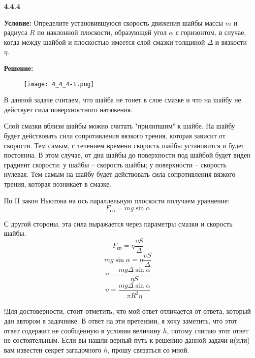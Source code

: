 \documentclass[a4paper,12pt]{article}	%
\begin{document}
 
\textbf{4.4.4}

\textbf{Условие:}
Определите установившуюся скорость движения шайбы массы $m$ и радиуса $R$ по наклонной плоскости, образующей угол $\alpha$ с горизонтом, в случае, когда между шайбой и плоскостью имеется слой смазки толщиной $\Delta$ и вязкости $\eta$.

\textbf{Решение:}
\begin{figure}[htp]
	\centering
	\texttt{[image: 4\_4\_4-1.png]}
\end{figure}

В данной задаче считаем, что шайба не тонет в слое смазке и что на шайбу не дей\-ству\-ет сила поверхностного натяжения.

Слой смазки вблизи шайбы можно считать "прилипшим" к шайбе. На шайбу бу\-дет действовать сила сопротивления вязкого трения, которая зависит от скорости. Тем са\-мым, с течением времени скорость шайбы установится и будет постоянна. В этом случае, от дна шайбы до поверхности под шайбой будет виден градиент скорости: у шайбы -- ско\-рость шайбы; у поверхности -- скорость нулевая. Тем самым на шайбу будет действовать сила сопротивления вязкого трения, которая возникает в смазке.

По II закон Ньютона на ось параллельную плоскости получаем уравнение:
$$F_{сп}=mg\sin\alpha$$

С другой стороны, эта сила выражается через параметры смазки и скорость шайбы.
$$F_{сп}=\eta\frac{\upsilon S}{\Delta}$$
$$mg\sin\alpha=\eta\frac{\upsilon S}{\Delta}$$
$$\upsilon=\frac{mg\Delta\sin\alpha}{\eta S}$$
$$\boxed{\upsilon=\frac{mg\Delta\sin\alpha}{\pi R^2\eta}}$$

\large!\footnotesize Для достоверности, стоит отметить, что мой ответ отличается от ответа, который дан автором в задачнике. В ответ на эти претензии, я хочу заметить, что этот ответ содержит не сообщённую в условии величину $h$, потому считаю этот ответ не состоятельным. Если вы нашли верный путь к решению данной задачи и(или) вам известен секрет загадочного $h$, прошу связаться со мной.
\end{document}
